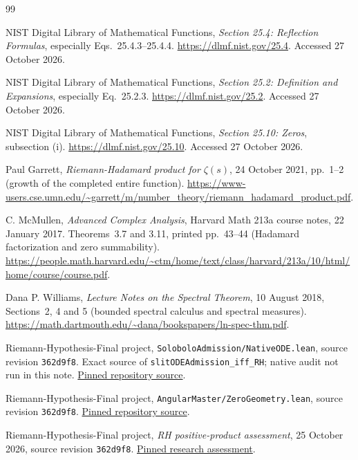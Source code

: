 \documentclass[11pt,a4paper]{article}
\numberwithin{equation}{section}
\theoremstyle{definition}
\theoremstyle{remark}
\begin{document}
\begin{thebibliography}{99}
\small\raggedright
\setlength{\itemsep}{2pt}\setlength{\parsep}{0pt}\setlength{\parskip}{0pt}
NIST Digital Library of Mathematical Functions,
\emph{Section 25.4: Reflection Formulas}, especially Eqs.~25.4.3--25.4.4.
\url{https://dlmf.nist.gov/25.4}. Accessed 27 October 2026.

NIST Digital Library of Mathematical Functions,
\emph{Section 25.2: Definition and Expansions}, especially Eq.~25.2.3.
\url{https://dlmf.nist.gov/25.2}. Accessed 27 October 2026.

NIST Digital Library of Mathematical Functions,
\emph{Section 25.10: Zeros}, subsection (i).
\url{https://dlmf.nist.gov/25.10}. Accessed 27 October 2026.

Paul Garrett, \emph{Riemann-Hadamard product for $\zeta(s)$},
24 October 2021, pp.~1--2 (growth of the completed entire function).
\url{https://www-users.cse.umn.edu/~garrett/m/number_theory/riemann_hadamard_product.pdf}.

C. McMullen, \emph{Advanced Complex Analysis}, Harvard Math 213a
course notes, 22 January 2017. Theorems~3.7 and 3.11,
printed pp.~43--44 (Hadamard factorization and zero summability).
\url{https://people.math.harvard.edu/~ctm/home/text/class/harvard/213a/10/html/home/course/course.pdf}.

Dana P. Williams, \emph{Lecture Notes on the Spectral Theorem},
10 August 2018, Sections~2, 4 and 5 (bounded spectral calculus and
spectral measures).
\url{https://math.dartmouth.edu/~dana/bookspapers/ln-spec-thm.pdf}.

Riemann-Hypothesis-Final project, \texttt{SoloboloAdmission/NativeODE.lean},
source revision \texttt{362d9f8}. Exact source of
\texttt{slitODEAdmission\_iff\_RH}; native audit not run in this note.
\href{https://github.com/randogelist/Riemann-Hypothesis-Final/blob/362d9f8aeaaf9479cc27ceb6b63bdb7456267990/SoloboloAdmission/NativeODE.lean}{Pinned repository source}.

Riemann-Hypothesis-Final project, \texttt{AngularMaster/ZeroGeometry.lean},
source revision \texttt{362d9f8}.
\href{https://github.com/randogelist/Riemann-Hypothesis-Final/blob/362d9f8aeaaf9479cc27ceb6b63bdb7456267990/AngularMaster/ZeroGeometry.lean}{Pinned repository source}.

Riemann-Hypothesis-Final project,
\emph{RH positive-product assessment}, 25 October 2026,
source revision \texttt{362d9f8}.
\href{https://github.com/randogelist/Riemann-Hypothesis-Final/blob/362d9f8aeaaf9479cc27ceb6b63bdb7456267990/docs/research/2026-10-25/rh-positive-product-assessment.md}{Pinned research assessment}.


\end{thebibliography}
\end{document}
